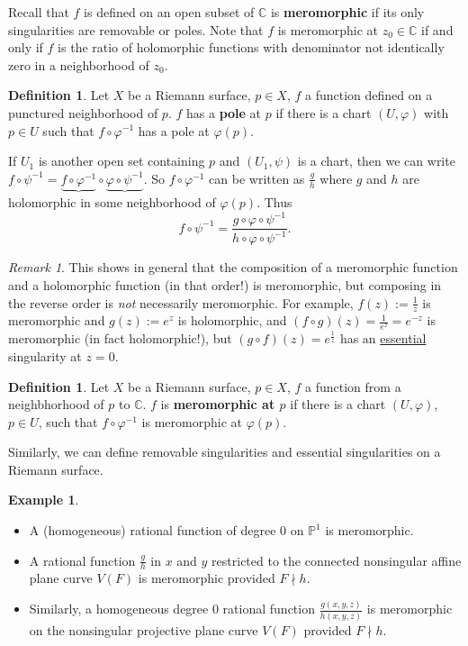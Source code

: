 \documentclass[12pt]{article}
\newcommand{\cx}{\mathbb{C}}
\newcommand{\p}{\mathbb{P}}
\newcommand{\ita}[1]{\textit{#1}}
\newcommand\inv[1]{#1^{-1}}
\theoremstyle{definition}
\newtheorem{definition}[theorem]{Definition}
\newtheorem{example}[theorem]{Example}
\theoremstyle{remark}
\newtheorem*{remark}{Remark}
\begin{document}
Recall that $f$ is defined on an open subset of $\cx$ is \textbf{meromorphic} if its only singularities are removable or poles. Note that $f$ is meromorphic at $z_0\in\cx$ if and only if $f$ is the ratio of holomorphic functions with denominator not identically zero in a neighborhood of $z_0$.
\begin{definition}
    Let $X$ be a Riemann surface, $p\in X$, $f$ a function defined on a punctured neighborhood of $p$. $f$ has a \textbf{pole} at $p$ if there is a chart $(U,\varphi)$ with $p\in U$ such that $f\circ\inv{\varphi}$ has a pole at $\varphi(p)$. 
\end{definition}
If $U_1$ is another open set containing $p$ and $(U_1,\psi)$ is a chart, then we can write $f\circ\inv{\psi}=\underbrace{f\circ\inv{\varphi}}\circ\underbrace{\varphi\circ\inv{\psi}}$. So $f\circ\inv{\varphi}$ can be written as $\frac{g}{h}$ where $g$ and $h$ are holomorphic in some neighborhood of $\varphi(p)$. Thus
\begin{equation}
    f\circ\inv{\psi}=\frac{g\circ\varphi\circ\inv{\psi}}{h\circ\varphi\circ\inv{\psi}}.
\end{equation}
\begin{remark}
    This shows in general that the composition of a meromorphic function and a holomorphic function (in that order!) is meromorphic, but composing in the reverse order is \ita{not} necessarily meromorphic. For example, $f(z):=\frac{1}{z}$ is meromorphic and $g(z):=e^z$ is holomorphic, and $(f\circ g)(z)=\frac{1}{e^z}=e^{-z}$ is meromorphic (in fact holomorphic!), but $(g\circ f)(z)=e^{\frac{1}{z}}$ has an \underline{essential} singularity at $z=0$.
\end{remark}
\begin{definition}
    Let $X$ be a Riemann surface, $p\in X$, $f$ a function from a neighbhorhood of $p$ to $\cx$. $f$ is \textbf{meromorphic at $p$} if there is a chart $(U,\varphi)$, $p\in U$, such that $f \circ \inv{\varphi}$ is meromorphic at $\varphi(p)$.
\end{definition}
Similarly, we can define removable singularities and essential singularities on a Riemann surface.
\begin{example}
    \noindent
    \begin{itemize}
        \item A (homogeneous) rational function of degree $0$ on $\p^1$ is meromorphic.
        \item A rational function $\frac{g}{h}$ in $x$ and $y$ restricted to the connected nonsingular affine plane curve $V(F)$ is meromorphic provided $F\nmid h$.
        \item Similarly, a homogeneous degree $0$ rational function $\frac{g(x,y,z)}{h(x,y,z)}$ is meromorphic on the nonsingular projective plane curve $V(F)$ provided $F\nmid h$.
    \end{itemize}
\end{example}
\end{document}
